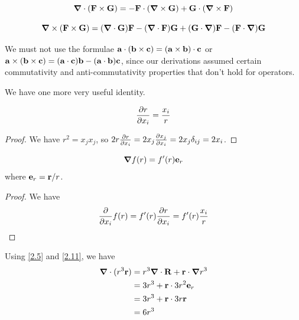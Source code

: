 \documentclass{../../template/note}
\begin{document}
    \begin{proposition}
        \[
            \grad \cdot (\V F \times \V G) = -\V F \cdot (\grad \times \V G) + \V G \cdot (\grad \times \V F)
        \]
    \end{proposition}
    
    \begin{proposition}
        \[
            \grad \times (\V F \times \V G) = (\grad \cdot \V G) \V F - (\grad \cdot \V F)\V G + (\V G \cdot \grad)\V F - (\V F \cdot \grad)\V G
        \]
    \end{proposition}
    
    \begin{remark*}
        We must not use the formulae \(\V a \cdot (\V b \times \V c) = (\V a \times \V b) \cdot \V c\) or \(\V a \times (\V b \times \V c) = (\V a \cdot \V c) \V b - (\V a \cdot \V b)\V c\), since our derivations assumed certain commutativity and anti-commutativity properties that don't hold for operators.
    \end{remark*}
    
    We have one more very useful identity.

    \begin{proposition}
        \[
            \pd{r}{x_i} = \frac{x_i}{r}
        \]
    \end{proposition}
    
    \begin{proof}
        We have \(r^2 = x_jx_j\), so \(2r \pd{r}{x_i} = 2x_j \pd{x_j}{x_i} = 2x_j \delta_{ij} = 2x_i\).
    \end{proof}
    
    \begin{corollary}
        \label{2.11}\[
            \grad f(r) = f'(r) \V e_r
        \]
        where \(\V e_r = \V r / r\).
    \end{corollary}
    
    \begin{proof}
        We have
        \begin{align*}
            \pd{}{x_i} f(r) = f'(r) \pd{r}{x_i} = f'(r) \frac{x_i}{r}
        \end{align*}
    \end{proof}
    
    \begin{example*}
        Using \cref{2.5} and \cref{2.11}, we have
        \begin{align*}
            \grad \cdot (r^3 \V r) &= r^3 \grad \cdot \V R + \V r \cdot \grad r^3 \\
            &= 3r^3 + \V r \cdot 3r^2 \V e_r \\
            &= 3r^3 + \V r \cdot 3 r \V r \\
            &= 6r^3
        \end{align*}
    \end{example*}
    
\end{document}
